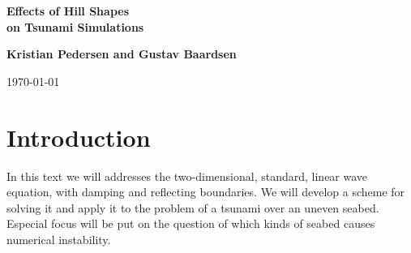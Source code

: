 \documentclass[twoside]{article}
\begin{document}






\begin{center}
{\LARGE\bf Effects of Hill Shapes \\ [1.5mm] on Tsunami Simulations}
\end{center}





\begin{center}
{\bf Kristian Pedersen and Gustav Baardsen} \\ [0mm]
\end{center}






\begin{center}
\today
\end{center}

\vspace{1cm}



\begin{abstract}

In this project we study how the shape of hills at the sea bottom
affects numerical and physical properties of simulations of
 earthquake-generated tsunamis. The tsunamis are modelled using 
two-dimensional wave equations, and a finite difference scheme is 
used to solve the partial differential equations.


\end{abstract}

\tableofcontents



\section{Introduction}
\label{Introduction}
In this text we will addresses the two-dimensional, standard, linear wave equation, with damping and reflecting boundaries. We will develop a scheme for solving it and apply it to the problem of a tsunami over an uneven seabed. Especial focus will be put on the question of which kinds of seabed causes numerical instability. 
\end{document}
